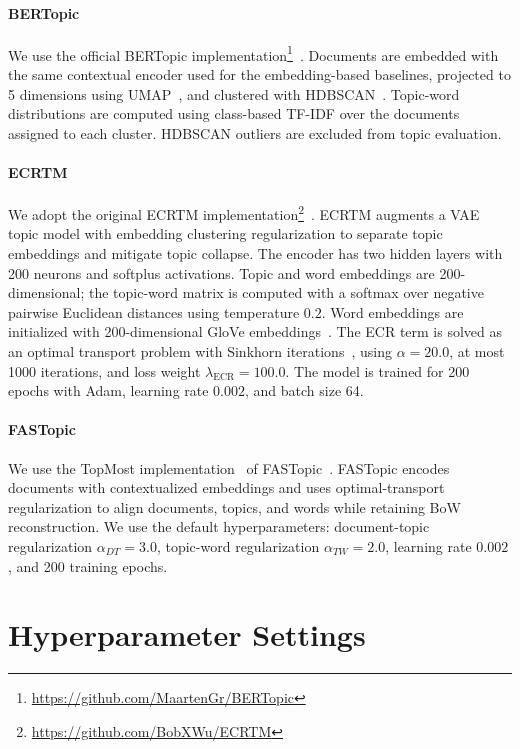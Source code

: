 \documentclass{article}
\theoremstyle{plain}
\theoremstyle{definition}
\theoremstyle{remark}
\begin{document}
\paragraph{BERTopic}
We use the official BERTopic implementation\footnote{\url{https://github.com/MaartenGr/BERTopic}}~\citep{grootendorst2022bertopic}. Documents are embedded with the same contextual encoder used for the embedding-based baselines, projected to 5 dimensions using UMAP~\citep{McInnes2018}, and clustered with HDBSCAN~\citep{campello2013density}. Topic-word distributions are computed using class-based TF-IDF over the documents assigned to each cluster. HDBSCAN outliers are excluded from topic evaluation.

\paragraph{ECRTM}
We adopt the original ECRTM implementation\footnote{\url{https://github.com/BobXWu/ECRTM}}~\citep{wu2023effective}. ECRTM augments a VAE topic model with embedding clustering regularization to separate topic embeddings and mitigate topic collapse. The encoder has two hidden layers with 200 neurons and softplus activations. Topic and word embeddings are 200-dimensional; the topic-word matrix is computed with a softmax over negative pairwise Euclidean distances using temperature $0.2$. Word embeddings are initialized with 200-dimensional GloVe embeddings~\citep{pennington-etal-2014-glove}. The ECR term is solved as an optimal transport problem with Sinkhorn iterations~\citep{sinkhorn1964relationship, cuturi2013sinkhorn}, using $\alpha=20.0$, at most 1000 iterations, and loss weight $\lambda_{\mathrm{ECR}}=100.0$. The model is trained for 200 epochs with Adam, learning rate $0.002$, and batch size 64.

\paragraph{FASTopic}
We use the TopMost implementation~\citep{wu-etal-2024-towards-topmost} of FASTopic~\citep{wu2024fastopic}. FASTopic encodes documents with contextualized embeddings and uses optimal-transport regularization to align documents, topics, and words while retaining BoW reconstruction. We use the default hyperparameters: document-topic regularization $\alpha_{DT}=3.0$, topic-word regularization $\alpha_{TW}=2.0$, learning rate $0.002$, and 200 training epochs.

\section{Hyperparameter Settings}
\label{sec:hyperparameters}
\end{document}
